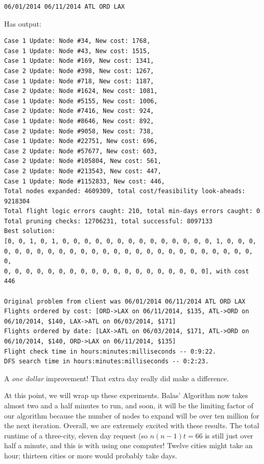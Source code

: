 \documentclass{article}
\begin{document}
\begin{verbatim}
06/01/2014 06/11/2014 ATL ORD LAX
\end{verbatim}

Has output:

\scriptsize
\begin{verbatim}
Case 1 Update: Node #34, New cost: 1768, 
Case 1 Update: Node #43, New cost: 1515, 
Case 1 Update: Node #169, New cost: 1341, 
Case 2 Update: Node #398, New cost: 1267, 
Case 1 Update: Node #718, New cost: 1187, 
Case 2 Update: Node #1624, New cost: 1081, 
Case 1 Update: Node #5155, New cost: 1006, 
Case 2 Update: Node #7416, New cost: 924, 
Case 1 Update: Node #8646, New cost: 892, 
Case 2 Update: Node #9058, New cost: 738, 
Case 1 Update: Node #22751, New cost: 696, 
Case 2 Update: Node #57677, New cost: 603, 
Case 2 Update: Node #105804, New cost: 561, 
Case 2 Update: Node #213543, New cost: 447, 
Case 1 Update: Node #1152833, New cost: 446, 
Total nodes expanded: 4609309, total cost/feasibility look-aheads: 9218304
Total flight logic errors caught: 210, total min-days errors caught: 0
Total pruning checks: 12706231, total successful: 8097133
Best solution:
[0, 0, 1, 0, 1, 0, 0, 0, 0, 0, 0, 0, 0, 0, 0, 0, 0, 0, 0, 1, 0, 0, 0,
0, 0, 0, 0, 0, 0, 0, 0, 0, 0, 0, 0, 0, 0, 0, 0, 0, 0, 0, 0, 0, 0, 0, 0,
0, 0, 0, 0, 0, 0, 0, 0, 0, 0, 0, 0, 0, 0, 0, 0, 0, 0, 0], with cost 446

Original problem from client was 06/01/2014 06/11/2014 ATL ORD LAX
Flights ordered by cost: [ORD->LAX on 06/11/2014, $135, ATL->ORD on 06/10/2014, $140, LAX->ATL on 06/03/2014, $171]
Flights ordered by date: [LAX->ATL on 06/03/2014, $171, ATL->ORD on 06/10/2014, $140, ORD->LAX on 06/11/2014, $135]
Flight check time in hours:minutes:milliseconds -- 0:9:22.
DFS search time in hours:minutes:milliseconds -- 0:2:23.
\end{verbatim}
\normalsize

A \emph{one dollar} improvement! That extra day really did make a difference.

At this point, we will wrap up these experiments. Balas' Algorithm now takes almost two and a half minutes to run, and soon, it will be the limiting
factor of our algorithm because the number of nodes to expand will be over ten million for the next iteration. Overall, we are extremely excited with
these results.  The total runtime of a three-city, eleven day request (so $n(n-1)t = 66$ is still just over half a minute, and this is with using one
computer! Twelve cities might take an hour; thirteen cities or more would probably take days.
\end{document}
